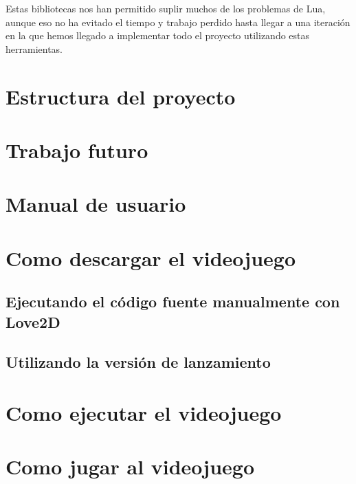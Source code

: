 \documentclass[12pt, spanish]{article}
\begin{document}
Estas bibliotecas nos han permitido suplir muchos de los problemas de Lua, aunque eso no ha evitado el tiempo y trabajo perdido hasta llegar a una iteración en la que hemos llegado a implementar todo el proyecto utilizando estas herramientas.

\section{Estructura del proyecto}


\section*{Trabajo futuro}
\label{sec:futuro}


\section*{Manual de usuario}
\label{sec:manual}

\section{Como descargar el videojuego}

\subsection{Ejecutando el código fuente manualmente con Love2D}

\subsection{Utilizando la versión de lanzamiento}


\section{Como ejecutar el videojuego}

\section{Como jugar al videojuego}
\end{document}
